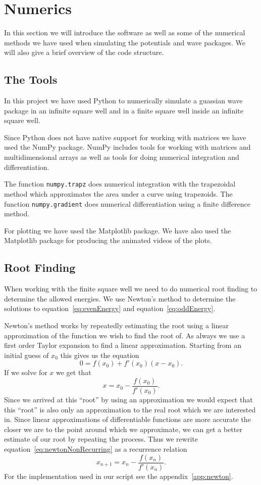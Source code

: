 \documentclass[12pt,a4paper]{article}
\begin{document}
\section{Numerics}
In this section we will introduce the software as well as some of the numerical methods we have used when simulating the potentials and wave packages. We will also give a brief overview of the code structure.

\subsection{The Tools}
In this project we have used Python to numerically simulate a guassian wave package in an infinite square well and in a finite square well inside an infinite square well.

Since Python does not have native support for working with matrices we have used the NumPy package. NumPy includes tools for working with matrices and multidimensional arrays as well as tools for doing numerical integration and differentiation.

The function \lstinline{numpy.trapz} does numerical integration with the trapezoidal method which approximates the area under a curve using trapezoids. The function \lstinline{numpy.gradient} does numerical differentiation using a finite difference method.

For plotting we have used the Matplotlib package. We have also used the Matplotlib package for producing the animated videos of the plots.

\subsection{Root Finding}
When working with the finite square well we need to do numerical root finding to determine the allowed energies. We use Newton's method to determine the solutions to equation~\eqref{eq:evenEnergy} and equation~\eqref{eq:oddEnergy}.

Newton's method works by repeatedly estimating the root using a linear approximation of the function we wish to find the root of. As always we use a first order Taylor expansion to find a linear approximation. Starting from an initial guess of $x_0$ this gives us the equation
\begin{equation}
0 = f(x_0) + f'(x_0)(x - x_0).
\end{equation}
If we solve for $x$ we get that
\begin{equation}
x = x_0 - \frac{f(x_0)}{f'(x_0)}. \label{eq:newtonNonRecurring}
\end{equation}
Since we arrived at this ``root'' by using an approximation we would expect that this ``root'' is also only an approximation to the real root which we are interested in. Since linear approximations of differentiable functions are more accurate the closer we are to the point around which we approximate, we can get a better estimate of our root by repeating the process. Thus we rewrite equation~\eqref{eq:newtonNonRecurring} as a recurrence relation
\begin{equation}
x_{n+1} = x_n - \frac{f(x_n)}{f'(x_n)}.
\end{equation}
For the implementation used in our script see the appendix~\ref{app:newton}.
\end{document}
